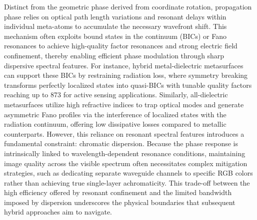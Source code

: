 \documentclass[11pt]{article}
\begin{document}
Distinct from the geometric phase derived from coordinate rotation, propagation phase relies on optical path length variations and resonant delays within individual meta-atoms to accumulate the necessary wavefront shift. This mechanism often exploits bound states in the continuum (BICs) or Fano resonances to achieve high-quality factor resonances and strong electric field confinement, thereby enabling efficient phase modulation through sharp dispersive spectral features. \citep{doi_10_1002_adpr_202400191_88f03cd9} For instance, hybrid metal-dielectric metasurfaces can support these BICs by restraining radiation loss, where symmetry breaking transforms perfectly localized states into quasi-BICs with tunable quality factors reaching up to 873 for active sensing applications. Similarly, all-dielectric metasurfaces utilize high refractive indices to trap optical modes and generate asymmetric Fano profiles via the interference of localized states with the radiation continuum, offering low dissipative losses compared to metallic counterparts. \citep{doi_10_1021_acsnano_4c16934_9c79f5cf} However, this reliance on resonant spectral features introduces a fundamental constraint: chromatic dispersion. Because the phase response is intrinsically linked to wavelength-dependent resonance conditions, maintaining image quality across the visible spectrum often necessitates complex mitigation strategies, such as dedicating separate waveguide channels to specific RGB colors rather than achieving true single-layer achromaticity. This trade-off between the high efficiency offered by resonant confinement and the limited bandwidth imposed by dispersion underscores the physical boundaries that subsequent hybrid approaches aim to navigate. \citep{doi_10_1002_adpr_202400191_88f03cd9} \citep{s2_42f2fcc893f3a45ac750a8ffe67752f8533c0c61_58d9419c} \citep{doi_10_1038_s41377_025_01761_w_a73a6b84}
\end{document}
